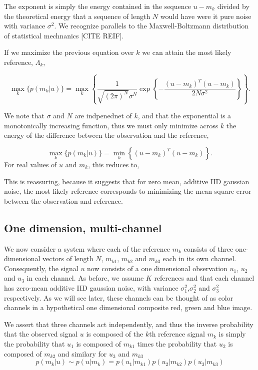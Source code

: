 The exponent is simply the energy contained in the sequence $u-m_k$ divided by the
theoretical energy that a sequence of length $N$ would have were it pure noise with variance $\sigma^2$. We recognize parallels to the Maxwell-Boltzmann distribution of statistical
mechnanics [CITE REIF].  


If we maximize the previous equation over $k$ we can attain the most likely reference, $\Lambda_k$,


\begin{equation}
\max_k   \big\{ p(m_k|u) \big\} =  \max_k  \left\{ \frac{1}{  \sqrt{ (2\pi)^N} \sigma^N  } \exp\left\{ -\frac{(u-m_k)^T(u-m_k)} {2 N \sigma^2 } \right\} \right\}. 
\end{equation}

We note that $\sigma$ and $N$ are indpenednet of $k$, and that the exponential is a monotonically increasing function, thus we must only minimize across $k$ the energy of the difference between the observation and the reference,

\begin{equation}
\max_k   \big\{ p(m_k|u) \big\} =  \min_k  \left\{ (u-m_k)^T(u-m_k) \right\}. 
\end{equation}
For real values of  $u$ and $m_k$, this reduces to,



This is reassuring, because it suggests that for zero mean, additive IID gaussian noise, the most likely reference corresponds to minimizing the mean square error between the observation and reference. 

\subsection{One dimension, multi-channel}
We now consider a system where each of the reference $m_k$ consists of three one-dimensional vectors of length $N$, $m_{k1}$, $m_{k2}$ and $m_{k3}$ each in its own channel. Consequently, the signal $u$ now consists of a one dimensional observation $u_1$, $u_2$ and $u_3$ in each channel. As before, we assume $K$ references and that each channel has zero-mean additive IID gaussian noise, with variance $\sigma_1^2$,$\sigma_2^2$ and $\sigma_3^2$ respectively. As we will see later, these channels can be thought of as color channels in a hypothetical one dimensional composite red, green and blue image. 

We assert that three channels act independently, and thus the inverse probability that the observed signal $u$ is composed of the $k$th reference signal $m_k$ is simply the probability that $u_1$ is composed of $m_{k1}$ times the probability that $u_2$ is composed of $m_{k2}$ and similary for $u_3$ and $m_{k3}$
\begin{equation}
p(m_k|u)\sim p(u|m_k) = p(u_1|m_{k1})p(u_2|m_{k2})p(u_3|m_{k3})
\end{equation}

